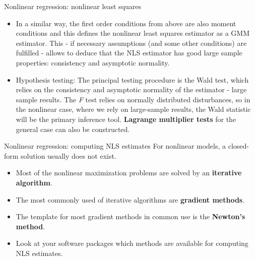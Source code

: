 \documentclass{beamer}
\begin{document}
\begin{frame}{Nonlinear regression: nonlinear least squares}
\begin{itemize}
\item In a similar way, the first order conditions from above are also moment conditions and this defines the nonlinear least squares estimator as a GMM estimator. This - if necessary assumptions (and some other conditions) are fulfilled - allows to deduce that the NLS estimator has good large sample properties: consistency and asymptotic normality.
\item Hypothesis testing: The principal testing procedure is the Wald test, which relies on the consistency and asymptotic normality of the estimator - large sample results. The \textit{F} test relies on normally distributed disturbances, so in the nonlinear case, where we rely on large-sample results, the Wald statistic will be the primary inference tool. \textbf{Lagrange multiplier tests} for the general case can also be constructed.
\end{itemize}
\end{frame}

\begin{frame}{Nonlinear regression: computing NLS estimates}
For nonlinear models, a closed-form solution usually does not exist.
\begin{itemize}
\item Most of the nonlinear maximization problems are solved by an \textbf{iterative algorithm}.
\item The most commonly used of iterative algorithms are \textbf{gradient methods}.
\item The template for most gradient methods in common use is the \textbf{Newton's method}.
\item Look at your software packages which methods are available for computing NLS estimates.
\end{itemize}
\end{frame}
\end{document}
